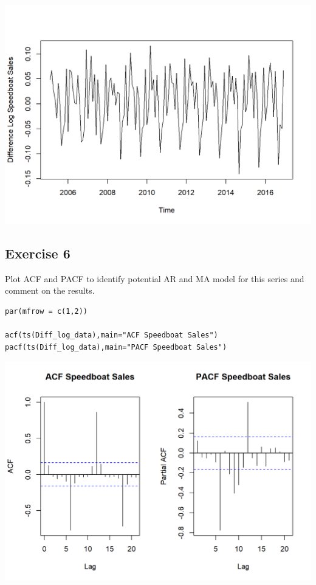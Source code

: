 \documentclass[a4paper,12pt]{article}
\begin{document}
\includegraphics[]{00-B2/images/Speedboat_6.png}

\newpage


\subsection*{Exercise 6}
\noindent Plot ACF and PACF to identify potential AR and MA model for this series and
comment on the results. 

\begin{framed}
\begin{verbatim}
par(mfrow = c(1,2))

acf(ts(Diff_log_data),main="ACF Speedboat Sales")
pacf(ts(Diff_log_data),main="PACF Speedboat Sales")
\end{verbatim}
\end{framed}

\includegraphics[]{00-B2/images/Speedboat_7.png}
\end{document}
